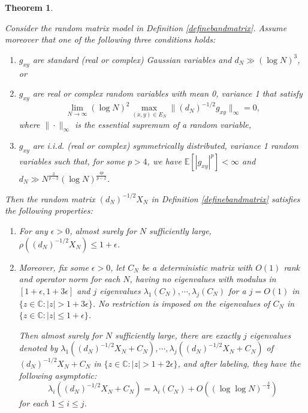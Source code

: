 \documentclass[11pt,reqno]{amsart}
\theoremstyle{plain}
\newtheorem{theorem}{Theorem}[section]
\theoremstyle{remark}
\numberwithin{equation}{section}
\begin{document}
\begin{theorem}\label{theorem1.1}  

Consider the random matrix model in Definition \ref{definebandmatrix}.
     Assume moreover that
    one of the following three conditions holds:
    \begin{enumerate}
        \item $g_{xy}$ are standard (real or complex) Gaussian variables and $d_N\gg(\log N)^3$, or
        \item $g_{xy}$ are real or complex random variables with mean 0, variance 1 that satisfy
        $$\lim_{N\to\infty} (\log N)^2 \max_{(x,y)\in E_N}{\|(d_N)^{-1/2}g_{xy}\|_\infty}=0,$$where $\|\cdot\|_\infty$ is the essential supremum of a random variable,
        \item $g_{xy}$ are i.i.d. (real or complex) symmetrically distributed, variance 1 random variables such that, for some $p>4$, we have  $\mathbb{E}[|g_{xy}|^p]<\infty$ and $d_N\gg N^\frac{2}{p-2}(\log N)^{\frac{4p}{p-2}}$.
    \end{enumerate} 
    
    Then the random matrix $(d_N)^{-1/2}X_N$ in Definition \ref{definebandmatrix} satisfies the following properties:
    \begin{enumerate}
        \item For any $\epsilon>0$, almost surely for $N$ sufficiently large, $\rho((d_N)^{-1/2}X_N)\leq 1+\epsilon$.
    
    \item Moreover, fix some $\epsilon>0$, let $C_N$ be a deterministic matrix with $O(1)$ rank and operator norm for each $N$, having no eigenvalues with modulus in $[1+\epsilon,1+3\epsilon]$ and $j$ eigenvalues $\lambda_1(C_N),\cdots,\lambda_j(C_N)$ for a $j=O(1)$ in $\{z\in\mathbb{C}:|z|>1+3\epsilon\}$. No restriction is imposed on the eigenvalues of $C_N$ in $\{z\in\mathbb{C}:|z|\leq 1+\epsilon\}$.
    
    
    Then almost surely for $N$ sufficiently large, there are exactly $j$ eigenvalues denoted by $\lambda_1((d_N)^{-1/2}X_N+C_N),\cdots,\lambda_j((d_N)^{-1/2}X_N+C_N)$ of $(d_N)^{-1/2}X_N+C_N$ in $\{z\in\mathbb{C}:|z|>1+2\epsilon\}$, and after labeling, they have the following asymptotic: $$\lambda_i((d_N)^{-1/2}X_N+C_N)=\lambda_i(C_N)+O((\log\log N)^{-\frac{3}{4}})$$ for each $1\leq i\leq j$.
    \end{enumerate}


    
     
\end{theorem}  
\end{document}
